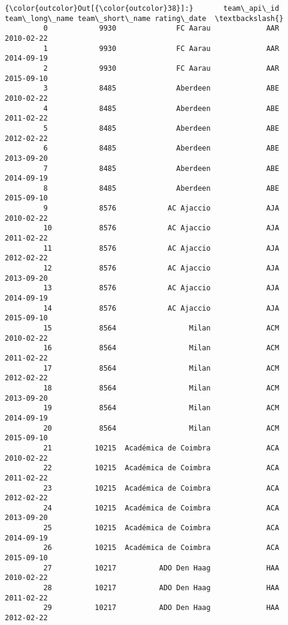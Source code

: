 \documentclass[11pt]{article}
\begin{document}
\begin{Verbatim}[commandchars=\\\{\}]
{\color{outcolor}Out[{\color{outcolor}38}]:}       team\_api\_id        team\_long\_name team\_short\_name rating\_date  \textbackslash{}
         0            9930              FC Aarau             AAR  2010-02-22   
         1            9930              FC Aarau             AAR  2014-09-19   
         2            9930              FC Aarau             AAR  2015-09-10   
         3            8485              Aberdeen             ABE  2010-02-22   
         4            8485              Aberdeen             ABE  2011-02-22   
         5            8485              Aberdeen             ABE  2012-02-22   
         6            8485              Aberdeen             ABE  2013-09-20   
         7            8485              Aberdeen             ABE  2014-09-19   
         8            8485              Aberdeen             ABE  2015-09-10   
         9            8576            AC Ajaccio             AJA  2010-02-22   
         10           8576            AC Ajaccio             AJA  2011-02-22   
         11           8576            AC Ajaccio             AJA  2012-02-22   
         12           8576            AC Ajaccio             AJA  2013-09-20   
         13           8576            AC Ajaccio             AJA  2014-09-19   
         14           8576            AC Ajaccio             AJA  2015-09-10   
         15           8564                 Milan             ACM  2010-02-22   
         16           8564                 Milan             ACM  2011-02-22   
         17           8564                 Milan             ACM  2012-02-22   
         18           8564                 Milan             ACM  2013-09-20   
         19           8564                 Milan             ACM  2014-09-19   
         20           8564                 Milan             ACM  2015-09-10   
         21          10215  Académica de Coimbra             ACA  2010-02-22   
         22          10215  Académica de Coimbra             ACA  2011-02-22   
         23          10215  Académica de Coimbra             ACA  2012-02-22   
         24          10215  Académica de Coimbra             ACA  2013-09-20   
         25          10215  Académica de Coimbra             ACA  2014-09-19   
         26          10215  Académica de Coimbra             ACA  2015-09-10   
         27          10217          ADO Den Haag             HAA  2010-02-22   
         28          10217          ADO Den Haag             HAA  2011-02-22   
         29          10217          ADO Den Haag             HAA  2012-02-22   

\end{Verbatim}
\end{document}
